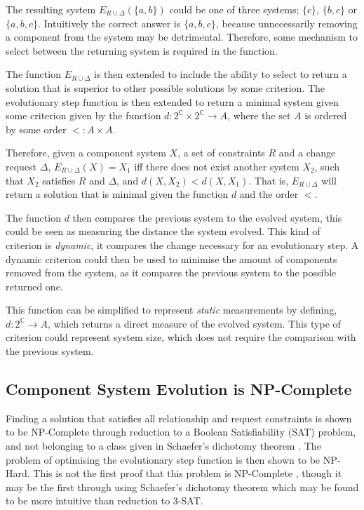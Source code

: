 The resulting system $E_{R \cup \Delta}(\{a,b\})$ could be one of three systems; $\{c\}$, $\{b,c\}$ or $\{a,b,c\}$.
Intuitively the correct answer is $\{a,b,c\}$, because unnecessarily removing a component from the system may be detrimental.
Therefore, some mechanism to select between the returning system is required in the function.
  
The function $E_{R \cup \Delta}$ is then extended to include the ability to select to return a solution that is superior to other possible solutions by some criterion.
The evolutionary step function is then extended to return a minimal system given some criterion given by the function $d: 2^\mathbb{C} \times 2^\mathbb{C} \rightarrow A$,
where the set $A$ is ordered by some order $<: A \times A$.

Therefore, given a component system $X$, a set of constraints $R$ and a change request $\Delta$,
$E_{R \cup \Delta}(X) = X_1$ iff there does not exist another system $X_2$, such that $X_2$ satisfies $R$ and $\Delta$, 
and $d(X,X_2) < d(X,X_1)$.
That is, $E_{R \cup \Delta}$ will return a solution that is minimal given the function $d$ and the order $<$.

The function $d$ then compares the previous system to the evolved system, this could be seen as measuring the distance the system evolved.
This kind of criterion is \textit{dynamic}, it compares the change necessary for an evolutionary step.
A dynamic criterion could then be used to minimise the amount of components removed from the system, as it compares the previous system to the possible returned one.

This function can be simplified to represent \textit{static} measurements by defining, $d: 2^\mathbb{C} \rightarrow A$, which returns a direct measure of the evolved system.
This type of criterion could represent system size, which does not require the comparison with the previous system.

\subsection{Component System Evolution is NP-Complete}
Finding a solution that satisfies all relationship and request constraints is shown to be NP-Complete through reduction to a Boolean Satisfiability (SAT) problem,
and not belonging to a class given in Schaefer's dichotomy theorem \cite{Schaefer1978}.
The problem of optimising the evolutionary step function is then shown to be NP-Hard.
This is not the first proof that this problem is NP-Complete \cite{edos2005report}, 
though it may be the first through using Schaefer's dichotomy theorem which may be found to be more intuitive than reduction to 3-SAT.

